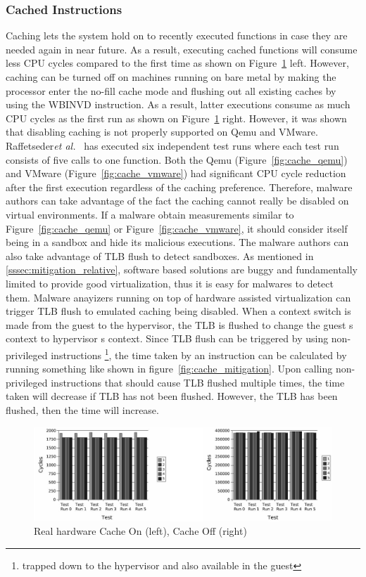\subsubsection{Cached Instructions}
Caching lets the system hold on to recently executed functions in case they are needed again in near future. As a result, executing cached functions will consume less CPU cycles compared to the first time as shown on Figure~\ref{fig:cache_realhw} left. However, caching can be turned off on machines running on bare metal by making the processor enter the no-fill cache mode and flushing out all existing caches by using the WBINVD instruction. As a result, latter executions consume as much CPU cycles as the first run as shown on Figure~\ref{fig:cache_realhw} right.
However, it was shown that disabling caching is not properly supported on Qemu and VMware. Raffetseder{\em et al.}~\cite{raffetseder2007} has executed six independent test runs where each test run consists of five calls to one function. Both the Qemu (Figure~\ref{fig:cache_qemu}) and VMware (Figure~\ref{fig:cache_vmware}) had significant CPU cycle reduction after the first execution regardless of the caching preference.
Therefore, malware authors can take advantage of the fact the caching cannot really be disabled on virtual environments. If a malware obtain measurements similar to Figure~\ref{fig:cache_qemu} or Figure~\ref{fig:cache_vmware}, it should consider itself being in a sandbox and hide its malicious executions.
The malware authors can also take advantage of TLB flush to detect sandboxes. As mentioned in \ref{sssec:mitigation_relative}, software based solutions are buggy and fundamentally limited to provide good virtualization, thus it is easy for malwares to detect them. Malware anayizers running on top of hardware assisted virtualization can trigger TLB flush to emulated caching being disabled. When a context switch is made from the guest to the hypervisor, the TLB is flushed to change the guest \textquotesingle s context to hypervisor \textquotesingle s context. Since TLB flush can be triggered by using non-privileged instructions \footnote{trapped down to the hypervisor and also available in the guest}, the time taken by an instruction can be calculated by running something like shown in figure~\ref{fig:cache_mitigation}. Upon calling non-privileged instructions that should cause TLB flushed multiple times, the time taken will decrease if TLB has not been flushed. However, the TLB has been flushed, then the time will increase.

\begin{figure}[!t]
	\centering
	\includegraphics[width=\textwidth]{figure/realhw.jpg}
	\caption{Real hardware Cache On (left), Cache Off (right)}
	\label{fig:cache_realhw}
\end{figure}


